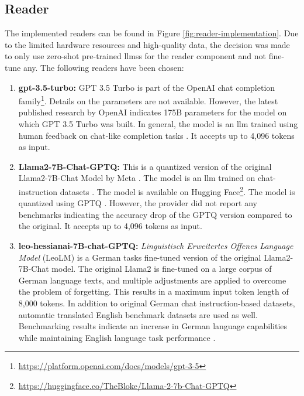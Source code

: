 \subsection{Reader}
\label{subsec:reader-impl}

The implemented readers can be found in Figure \ref{fig:reader-implementation}. Due to the limited hardware resources and high-quality data, the decision was made to only use zero-shot pre-trained \glspl{llm}s for the reader component and not fine-tune any. The following readers have been chosen:

\begin{enumerate}
    \item \textbf{gpt-3.5-turbo:} GPT 3.5 Turbo is part of the OpenAI chat completion family\footnote{\url{https://platform.openai.com/docs/models/gpt-3-5}}. Details on the parameters are not available. However, the latest published research by OpenAI indicates 175B parameters for the model on which GPT 3.5 Turbo was built. In general, the model is an \gls{llm} trained using human feedback on chat-like completion tasks \cite{ouyang_training_2022}. It accepts up to 4,096 tokens as input.
    \item \textbf{Llama2-7B-Chat-GPTQ:} This is a quantized version of the original Llama2-7B-Chat Model by Meta \cite{touvron_llama_2023}. The model is an \gls{llm} trained on chat-instruction datasets \cite{ouyang_training_2022}. The model is available on Hugging Face\footnote{\url{https://huggingface.co/TheBloke/Llama-2-7b-Chat-GPTQ}}. The model is quantized using GPTQ \cite{muennighoff_sgpt_2022}. However, the provider did not report any benchmarks indicating the accuracy drop of the GPTQ version compared to the original. It accepts up to 4,096 tokens as input.
    \item \textbf{leo-hessianai-7B-chat-GPTQ:} \textit{Linguistisch Erweitertes Offenes Language Model} (LeoLM) is a German tasks fine-tuned version of the original Llama2-7B-Chat model. The original Llama2 is fine-tuned on a large corpus of German language texts, and multiple adjustments are applied to overcome the problem of forgetting. This results in a maximum input token length of 8,000 tokens. In addition to original German chat instruction-based datasets, automatic translated English benchmark datasets are used as well. Benchmarking results indicate an increase in German language capabilities while maintaining English language task performance \cite{pluster_leolm_nodate}.
\end{enumerate}

